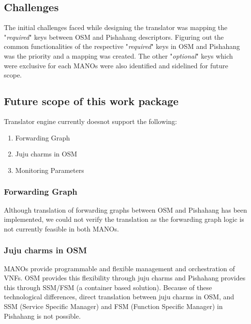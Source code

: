 \subsection{Challenges}
The initial challenges faced while designing the translator was mapping the "\textit{required}" keys between OSM and Pishahang descriptors. Figuring out the common functionalities of the respective "\textit{required}" keys in OSM and Pishahang was the priority and a mapping was created. The other "\textit{optional}" keys which were exclusive for each MANOs were also identified and sidelined for future scope.

\subsection{Future scope of this work package}

Translator engine currently doesnot support the following:
\begin{enumerate}
	\item Forwarding Graph
	\item Juju charms in OSM
	\item Monitoring Parameters
\end{enumerate}

\subsubsection{Forwarding Graph}
Although translation of forwarding graphs between OSM and  Pishahang has been implemented, we could not verify the translation as the forwarding graph logic is not currently feasible in both MANOs.

\subsubsection{Juju charms in OSM}
MANOs provide programmable and flexible management and orchestration of VNFs. OSM provides this flexibility through juju charms and Pishahang provides this through SSM/FSM (a container based solution). Because of these technological differences, direct translation between juju charms in OSM, and SSM (Service Specific Manager) and FSM (Function Specific Manager) in Pishahang is not possible. 

